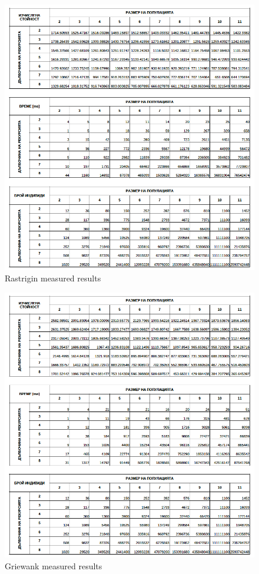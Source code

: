 \documentclass[graybox]{styles/svmult}
\begin{document}
\begin{figure}[b]
\sidecaption
\includegraphics[width=1.0\textwidth]{images/fig12}
\caption{Rastrigin measured results}
\label{fig:8}
\end{figure}

\begin{figure}[b]
\sidecaption
\includegraphics[width=1.0\textwidth]{images/fig13}
\caption{Griewank measured results}
\label{fig:9}
\end{figure}
\end{document}
